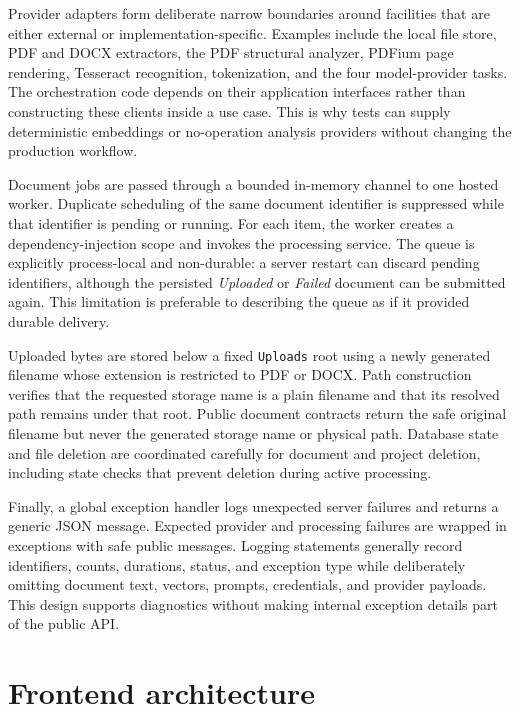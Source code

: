 Provider adapters form deliberate narrow boundaries around facilities that are
either external or implementation-specific. Examples include the local file
store, PDF and DOCX extractors, the PDF structural analyzer, PDFium page
rendering, Tesseract recognition, tokenization, and the four model-provider
tasks. The orchestration code depends on their application interfaces rather
than constructing these clients inside a use case. This is why tests can supply
deterministic embeddings or no-operation analysis providers without changing
the production workflow.

Document jobs are passed through a bounded in-memory channel to one hosted
worker. Duplicate scheduling of the same document identifier is suppressed
while that identifier is pending or running. For each item, the worker creates
a dependency-injection scope and invokes the processing service. The queue is
explicitly process-local and non-durable: a server restart can discard pending
identifiers, although the persisted \emph{Uploaded} or \emph{Failed} document
can be submitted again. This limitation is preferable to describing the queue
as if it provided durable delivery.

Uploaded bytes are stored below a fixed \texttt{Uploads} root using a newly
generated filename whose extension is restricted to PDF or DOCX. Path
construction verifies that the requested storage name is a plain filename and
that its resolved path remains under that root. Public document contracts
return the safe original filename but never the generated storage name or
physical path. Database state and file deletion are coordinated carefully for
document and project deletion, including state checks that prevent deletion
during active processing.

Finally, a global exception handler logs unexpected server failures and returns
a generic JSON message. Expected provider and processing failures are wrapped
in exceptions with safe public messages. Logging statements generally record
identifiers, counts, durations, status, and exception type while deliberately
omitting document text, vectors, prompts, credentials, and provider payloads.
This design supports diagnostics without making internal exception details part
of the public API.

\section{Frontend architecture}
\label{sec:frontend-architecture}

